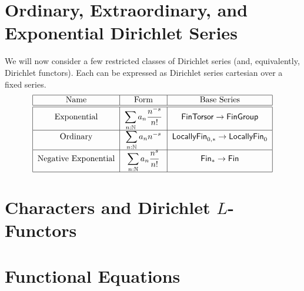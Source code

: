 \section{Ordinary, Extraordinary, and Exponential Dirichlet Series}

We will now consider a few restricted classes of Dirichlet series (and,
equivalently, Dirichlet functors). Each can be expressed as Dirichlet series
cartesian over a fixed series.
\[
  \begin{tabular}{|c|c|c|}
    \hline
    Name & Form & Base Series \\\hline\hline
    Exponential & $\displaystyle \sum_{n : \Nb} a_n\frac{n^{-s}}{n!}$ & $\type{FinTorsor} \to \type{FinGroup}$ \\ \hline
    Ordinary & $\displaystyle \sum_{n : \Nb} a_n n^{-s} $ & $\type{LocallyFin}_{0,\ast} \to \type{LocallyFin}_0$ \\ \hline
    Negative Exponential & $\displaystyle \sum_{n : \Nb} a_n \frac{n^s}{n!}$ & $\type{Fin}_{\ast} \to \type{Fin}$\\ \hline
  \end{tabular}
\]





\section{Characters and Dirichlet $L$-Functors}


\section{Functional Equations}
